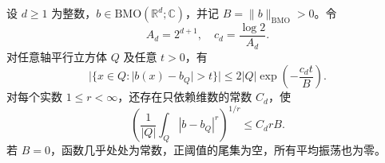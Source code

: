 \begin{theorem}\label{b2:thm:C-john-nirenberg}
设 \(d\geq1\) 为整数，\(b\in\mathrm{BMO}(\mathbb R^d;\mathbb C)\)，并记 \(B=\|b\|_{\mathrm{BMO}}>0\)。令
\[
 A_d=2^{d+1},\quad c_d=\frac{\log2}{A_d}.
\]
对任意轴平行立方体 \(Q\) 及任意 \(t>0\)，有
\begin{equation}\label{b2:eq:C-john-nirenberg-tail}
 |\{x\in Q:|b(x)-b_Q|>t\}|
 \leq2|Q|\exp\left(-\frac{c_dt}{B}\right).
\end{equation}
对每个实数 \(1\leq r<\infty\)，还存在只依赖维数的常数 \(C_d\)，使
\begin{equation}\label{b2:eq:C-finite-oscillation}
 \left(\frac1{|Q|}\int_Q|b-b_Q|^r\right)^{1/r}
 \leq C_drB.
\end{equation}
若 \(B=0\)，函数几乎处处为常数，正阈值的尾集为空，所有平均振荡也为零。
\end{theorem}
